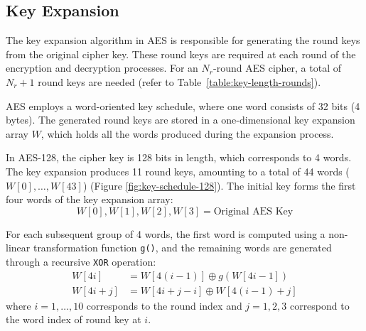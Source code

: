 \subsection{Key Expansion}
\label{sec:key-expansion}

The key expansion algorithm in \gls{AES} is responsible for generating the round keys from the original cipher key. 
These round keys are required at each round of the encryption and decryption processes. 
For an $N_r$-round \gls{AES} cipher, a total of $N_r + 1$ round keys are needed (refer to Table~\ref{table:key-length-rounds}).

AES employs a word-oriented key schedule, where one word consists of 32 bits (4 bytes).
The generated round keys are stored in a one-dimensional key expansion array $W$, which holds all the words produced during the expansion process.

In AES-128, the cipher key is 128 bits in length, which corresponds to 4 words. 
The key expansion produces 11 round keys, amounting to a total of 44 words ($W[0], \dots, W[43]$) (Figure \ref{fig:key-schedule-128}).
The initial key forms the first four words of the key expansion array:
\begin{equation}
    W[0], W[1], W[2], W[3] = \text{Original AES Key}
\end{equation}

For each subsequent group of 4 words, the first word is computed using a non-linear transformation function \texttt{g()}, and the remaining words are generated through a recursive \texttt{XOR} operation:
\begin{align}
    W[4i] &= W[4(i-1)] \oplus g(W[4i-1])\\
    W[4i+j] &= W[4i+j-i] \oplus W[4(i-1)+j]
\end{align}
where $i = 1,\dots,10$ corresponds to the round index and $j=1,2,3$ correspond to the word index of round key at $i$.

